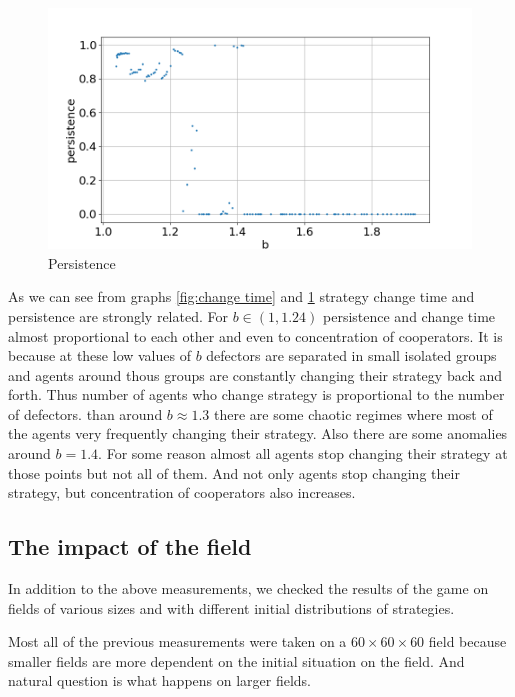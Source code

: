 \documentclass[a4paper]{jpconf}
\begin{document}
\begin{figure}[h]
	\includegraphics[width = \textwidth]{Persistence.png}
	\caption{Persistence}
	\label{fig:persistence}
\end{figure}

As we can see from graphs \ref{fig:change time} and \ref{fig:persistence} strategy change time and persistence are strongly related. For $b\in(1, 1.24)$ persistence and change time almost proportional to each other and even to concentration of cooperators. It is because at these low values of $b$ defectors are separated in small isolated groups and agents around thous groups are constantly changing their strategy back and forth. Thus number of agents who change strategy is proportional to the number of defectors. than around $b \approx 1.3$ there are some chaotic regimes where most of the agents very frequently changing their strategy. Also there are some anomalies around $b = 1.4$. For some reason almost all agents stop changing their strategy at those points but not all of them. And not only agents stop changing their strategy, but concentration of cooperators also increases. 

\subsection{The impact of the field}
In addition to the above measurements, we checked the results of the game on fields of various sizes and with different initial distributions of strategies.

Most all of the previous measurements were taken on a $60\times60\times60$ field because smaller fields are more dependent on the initial situation on the field. And natural question is what happens on larger fields.
\end{document}
